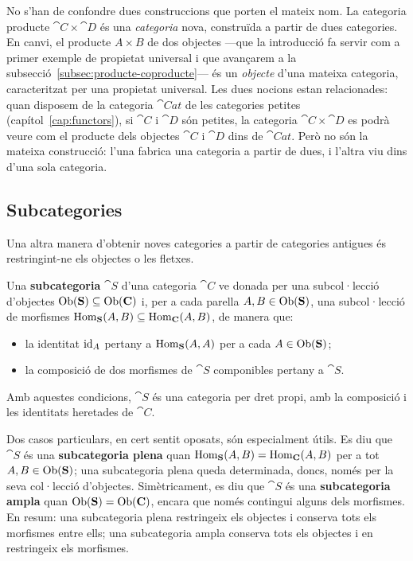 \begin{observacio}\label{obs:dos-productes}
No s'han de confondre dues construccions que porten el mateix nom. La categoria producte $\cat{C}\times\cat{D}$ és una \emph{categoria} nova, construïda a partir de dues categories. En canvi, el producte $A\times B$ de dos objectes ---que la introducció fa servir com a primer exemple de propietat universal i que avançarem a la subsecció~\ref{subsec:producte-coproducte}--- és un \emph{objecte} d'una mateixa categoria, caracteritzat per una propietat universal. Les dues nocions estan relacionades: quan disposem de la categoria $\cat{Cat}$ de les categories petites (capítol~\ref{cap:functors}), si $\cat{C}$ i $\cat{D}$ són petites, la categoria $\cat{C}\times\cat{D}$ es podrà veure com el producte dels objectes $\cat{C}$ i $\cat{D}$ dins de $\cat{Cat}$. Però no són la mateixa construcció: l'una fabrica una categoria a partir de dues, i l'altra viu dins d'una sola categoria.
\end{observacio}

\subsection{Subcategories}\label{subsec:subcategories}

Una altra manera d'obtenir noves categories a partir de categories antigues és restringint-ne els objectes o les fletxes.

\begin{definicio}
Una \textbf{subcategoria} $\cat{S}$ d'una categoria $\cat{C}$ ve donada per una subcol·lecció d'objectes $\operatorname{Ob}(\mathbf{S})\subseteq\operatorname{Ob}(\mathbf{C})$ i, per a cada parella $A,B\in\operatorname{Ob}(\mathbf{S})$, una subcol·lecció de morfismes $\operatorname{Hom}_{\mathbf{S}}(A,B)\subseteq\operatorname{Hom}_{\mathbf{C}}(A,B)$, de manera que:
\begin{itemize}
\item la identitat $\operatorname{id}_A$ pertany a $\operatorname{Hom}_{\mathbf{S}}(A,A)$ per a cada $A\in\operatorname{Ob}(\mathbf{S})$;
\item la composició de dos morfismes de $\cat{S}$ componibles pertany a $\cat{S}$.
\end{itemize}
Amb aquestes condicions, $\cat{S}$ és una categoria per dret propi, amb la composició i les identitats heretades de $\cat{C}$.
\end{definicio}

Dos casos particulars, en cert sentit oposats, són especialment útils. Es diu que $\cat{S}$ és una \textbf{subcategoria plena} quan $\operatorname{Hom}_{\mathbf{S}}(A,B)=\operatorname{Hom}_{\mathbf{C}}(A,B)$ per a tot $A,B\in\operatorname{Ob}(\mathbf{S})$; una subcategoria plena queda determinada, doncs, només per la seva col·lecció d'objectes. Simètricament, es diu que $\cat{S}$ és una \textbf{subcategoria ampla} quan $\operatorname{Ob}(\mathbf{S})=\operatorname{Ob}(\mathbf{C})$, encara que només contingui alguns dels morfismes. En resum: una subcategoria plena restringeix els objectes i conserva tots els morfismes entre ells; una subcategoria ampla conserva tots els objectes i en restringeix els morfismes.

